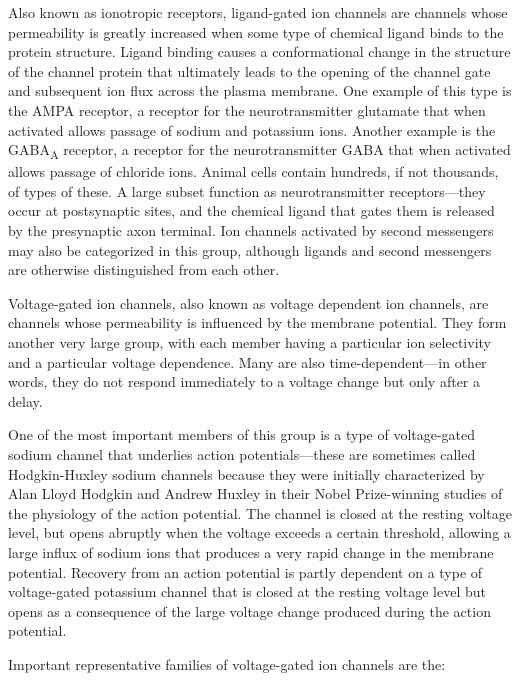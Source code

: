 Also known as ionotropic receptors, ligand-gated ion channels are channels whose permeability is greatly increased when some type of chemical ligand binds to the protein structure. Ligand binding causes a conformational change in the structure of the channel protein that ultimately leads to the opening of the channel gate and subsequent ion flux across the plasma membrane. One example of this type is the AMPA receptor, a receptor for the neurotransmitter glutamate that when activated allows passage of sodium and potassium ions. Another example is the GABA\textsubscript{A} receptor, a receptor for the neurotransmitter GABA that when activated allows passage of chloride ions. Animal cells contain hundreds, if not thousands, of types of these. A large subset function as neurotransmitter receptors---they occur at postsynaptic sites, and the chemical ligand that gates them is released by the presynaptic axon terminal. Ion channels activated by second messengers may also be categorized in this group, although ligands and second messengers are otherwise distinguished from each other.

Voltage-gated ion channels, also known as voltage dependent ion channels, are channels whose permeability is influenced by the membrane potential. They form another very large group, with each member having a particular ion selectivity and a particular voltage dependence. Many are also time-dependent---in other words, they do not respond immediately to a voltage change but only after a delay.

One of the most important members of this group is a type of voltage-gated sodium channel that underlies action potentials---these are sometimes called Hodgkin-Huxley sodium channels because they were initially characterized by Alan Lloyd Hodgkin and Andrew Huxley in their Nobel Prize-winning studies of the physiology of the action potential. The channel is closed at the resting voltage level, but opens abruptly when the voltage exceeds a certain threshold, allowing a large influx of sodium ions that produces a very rapid change in the membrane potential. Recovery from an action potential is partly dependent on a type of voltage-gated potassium channel that is closed at the resting voltage level but opens as a consequence of the large voltage change produced during the action potential.

Important representative families of voltage-gated ion channels are the:

